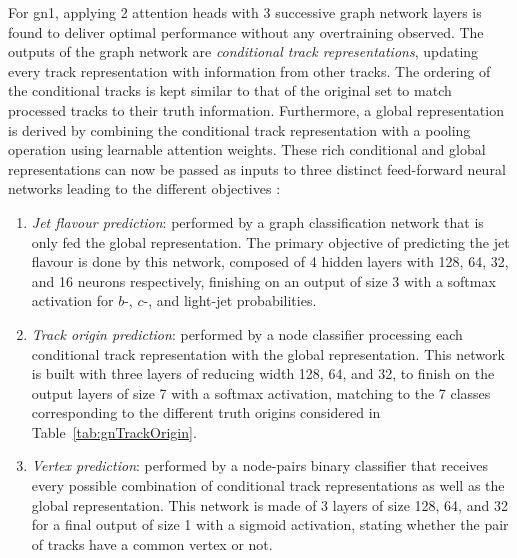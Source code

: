 For \gls{gn1}, applying 2 attention heads with 3 successive graph network layers is found to deliver optimal performance without any overtraining observed. The outputs of the graph network are \textit{conditional track representations}, updating every track representation with information from other tracks. The ordering of the conditional tracks is kept similar to that of the original set to match processed tracks to their truth information. Furthermore, a global representation is derived by combining the conditional track representation with a pooling operation using learnable attention weights. These rich conditional and global representations can now be passed as inputs to three distinct feed-forward neural networks leading to the different objectives \cite{ATL-PHYS-PUB-2022-027}:
\begin{enumerate}
  \item \textit{Jet flavour prediction}: performed by a graph classification network that is only fed the global representation. The primary objective of predicting the jet flavour is done by this network, composed of 4 hidden layers with 128, 64, 32, and 16 neurons respectively, finishing on an output of size 3 with a softmax activation for $b$-, $c$-, and light-jet probabilities.
  \item \textit{Track origin prediction}: performed by a node classifier processing each conditional track representation with the global representation. This network is built with three layers of reducing width 128, 64, and 32, to finish on the output layers of size 7 with a softmax activation, matching to the 7 classes corresponding to the different truth origins considered in Table~\ref{tab:gnTrackOrigin}.
  \item \textit{Vertex prediction}: performed by a node-pairs binary classifier that receives every possible combination of conditional track representations as well as the global representation. This network is made of 3 layers of size 128, 64, and 32 for a final output of size 1 with a sigmoid activation, stating whether the pair of tracks have a common vertex or not. 
\end{enumerate}

